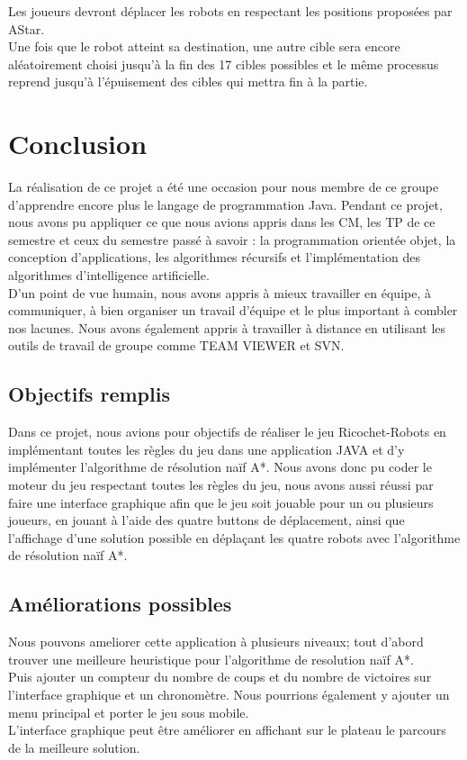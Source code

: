 \documentclass[12pt]{article}
\begin{document}
			Les joueurs devront déplacer les robots en respectant les positions proposées par AStar. 
			\\Une fois que le robot atteint sa destination, une autre cible sera encore aléatoirement choisi jusqu'à la fin des 17 cibles possibles et le même processus reprend jusqu'à l'épuisement des cibles qui mettra fin à la partie.
			
		
		\section{Conclusion }
		La réalisation de ce projet a été une occasion pour nous membre de ce groupe d’apprendre encore plus le langage de programmation Java.
		Pendant ce projet, nous avons pu appliquer ce que nous avions appris dans les CM, les TP de ce semestre et ceux du semestre passé à savoir : la programmation orientée objet, la conception d’applications, les algorithmes récursifs et l’implémentation des algorithmes d’intelligence artificielle. 
		\\D'un point de vue humain, nous avons appris à mieux travailler en équipe, à communiquer, à bien organiser un travail d’équipe et le plus important à combler nos lacunes.  
		Nous avons également appris à travailler à distance en utilisant les outils de travail de groupe comme TEAM VIEWER et SVN.
		
			\subsection{Objectifs remplis }
			
			Dans ce projet, nous avions pour objectifs de réaliser le jeu Ricochet-Robots en implémentant toutes les règles du jeu dans une application JAVA et d’y implémenter l’algorithme de résolution naïf A*. Nous avons donc pu coder le moteur du jeu respectant toutes les règles du jeu, nous avons aussi réussi par faire une interface graphique afin que le jeu soit jouable pour un ou plusieurs joueurs, en jouant à l’aide des quatre buttons de déplacement, ainsi que l’affichage d'une solution possible en déplaçant les quatre robots avec l’algorithme de résolution naïf A*. 
			
			\subsection{Améliorations possibles   }
			
			Nous pouvons ameliorer cette application à plusieurs niveaux; tout d'abord  trouver une meilleure heuristique pour l'algorithme de resolution naïf A*.
			\\Puis ajouter un compteur du nombre de coups et du nombre de victoires sur l’interface graphique et  un chronomètre. Nous pourrions également y ajouter un menu principal et porter le jeu sous mobile. 
			\\L’interface graphique peut être améliorer en affichant sur le plateau le parcours de la meilleure solution.
			
			
			
			
\end{document}
